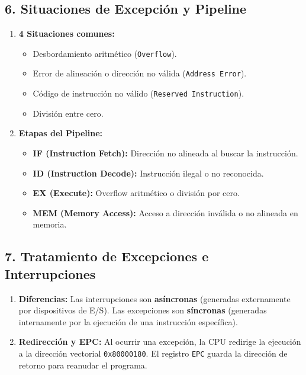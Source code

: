 \documentclass[12pt,a4paper]{article}
\begin{document}
\subsection*{6. Situaciones de Excepción y Pipeline}
\begin{enumerate}
    \item[a)] \textbf{4 Situaciones comunes:}
    \begin{itemize}
        \item Desbordamiento aritmético (\texttt{Overflow}).
        \item Error de alineación o dirección no válida (\texttt{Address Error}).
        \item Código de instrucción no válido (\texttt{Reserved Instruction}).
        \item División entre cero.
    \end{itemize}
    \item[b)] \textbf{Etapas del Pipeline:}
    \begin{itemize}
        \item \textbf{IF (Instruction Fetch):} Dirección no alineada al buscar la instrucción.
        \item \textbf{ID (Instruction Decode):} Instrucción ilegal o no reconocida.
        \item \textbf{EX (Execute):} Overflow aritmético o división por cero.
        \item \textbf{MEM (Memory Access):} Acceso a dirección inválida o no alineada en memoria.
    \end{itemize}
\end{enumerate}

\subsection*{7. Tratamiento de Excepciones e Interrupciones}
\begin{enumerate}
    \item[a)] \textbf{Diferencias:} Las interrupciones son \textbf{asíncronas} (generadas externamente por dispositivos de E/S). Las excepciones son \textbf{síncronas} (generadas internamente por la ejecución de una instrucción específica).
    \item[b)] \textbf{Redirección y EPC:} Al ocurrir una excepción, la CPU redirige la ejecución a la dirección vectorial \texttt{0x80000180}. El registro \texttt{EPC} guarda la dirección de retorno para reanudar el programa.
\end{enumerate}
\end{document}
